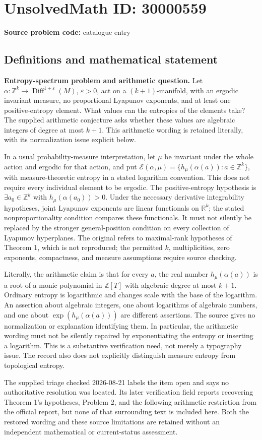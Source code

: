 \documentclass[11pt]{article}
\newcommand{\Z}{\mathbb{Z}}
\newcommand{\R}{\mathbb{R}}
\begin{document}
\section*{UnsolvedMath ID: 30000559}
\textbf{Source problem code:} catalogue entry
\subsection{Definitions and mathematical statement}
\textbf{Entropy-spectrum problem and arithmetic question.} Let \(\alpha:\Z^k\to\operatorname{Diff}^{1+\varepsilon}(M)\), \(\varepsilon>0\), act on a \((k+1)\)-manifold, with an ergodic invariant measure, no proportional Lyapunov exponents, and at least one positive-entropy element. What values can the entropies of the elements take? The supplied arithmetic conjecture asks whether these values are algebraic integers of degree at most \(k+1\). This arithmetic wording is retained literally, with its normalization issue explicit below.\par In a usual probability-measure interpretation, let \(\mu\) be invariant under the whole action and ergodic for that action, and put \(\mathcal E(\alpha,\mu)=\{h_\mu(\alpha(a)):a\in\Z^k\}\), with measure-theoretic entropy in a stated logarithm convention. This does not require every individual element to be ergodic. The positive-entropy hypothesis is \(\exists a_0\in\Z^k\) with \(h_\mu(\alpha(a_0))>0\). Under the necessary derivative integrability hypotheses, joint Lyapunov exponents are linear functionals on \(\R^k\); the stated nonproportionality condition compares these functionals. It must not silently be replaced by the stronger general-position condition on every collection of Lyapunov hyperplanes. The original refers to maximal-rank hypotheses of Theorem 1, which is not reproduced; the permitted \(k\), multiplicities, zero exponents, compactness, and measure assumptions require source checking.\par Literally, the arithmetic claim is that for every \(a\), the real number \(h_\mu(\alpha(a))\) is a root of a monic polynomial in \(\Z[T]\) with algebraic degree at most \(k+1\). Ordinary entropy is logarithmic and changes scale with the base of the logarithm. An assertion about algebraic integers, one about logarithms of algebraic numbers, and one about \(\exp(h_\mu(\alpha(a)))\) are different assertions. The source gives no normalization or explanation identifying them. In particular, the arithmetic wording must not be silently repaired by exponentiating the entropy or inserting a logarithm. This is a substantive verification need, not merely a typography issue. The record also does not explicitly distinguish measure entropy from topological entropy.\par The supplied triage checked 2026-08-21 labels the item open and says no authoritative resolution was located. Its later verification field reports recovering Theorem 1's hypotheses, Problem 2, and the following arithmetic restriction from the official report, but none of that surrounding text is included here. Both the restored wording and these source limitations are retained without an independent mathematical or current-status assessment.
\end{document}
